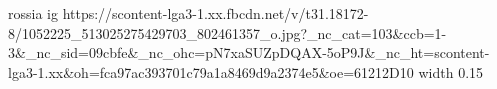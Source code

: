  
 
 
 
 

\par
rossia
\ifcmt
  ig https://scontent-lga3-1.xx.fbcdn.net/v/t31.18172-8/1052225_513025275429703_802461357_o.jpg?_nc_cat=103&ccb=1-3&_nc_sid=09cbfe&_nc_ohc=pN7xaSUZpDQAX-5oP9J&_nc_ht=scontent-lga3-1.xx&oh=fca97ac393701c79a1a8469d9a2374e5&oe=61212D10
  width 0.15
\fi

